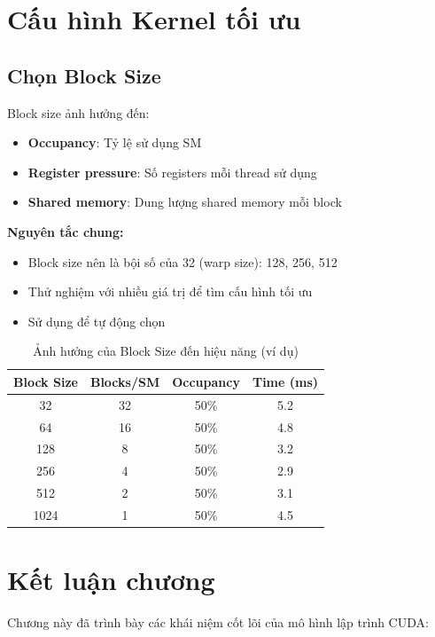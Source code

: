 \section{Cấu hình Kernel tối ưu}

\subsection{Chọn Block Size}

Block size ảnh hưởng đến:
\begin{itemize}
    \item \textbf{Occupancy}: Tỷ lệ sử dụng SM
    \item \textbf{Register pressure}: Số registers mỗi thread sử dụng
    \item \textbf{Shared memory}: Dung lượng shared memory mỗi block
\end{itemize}

\textbf{Nguyên tắc chung:}
\begin{itemize}
    \item Block size nên là bội số của 32 (warp size): 128, 256, 512
    \item Thử nghiệm với nhiều giá trị để tìm cấu hình tối ưu
    \item Sử dụng  để tự động chọn
\end{itemize}

\begin{table}[H]
\centering
\caption{Ảnh hưởng của Block Size đến hiệu năng (ví dụ)}
\label{tab:blocksize_perf}
\begin{tabular}{@{}cccc@{}}
\toprule
\textbf{Block Size} & \textbf{Blocks/SM} & \textbf{Occupancy} & \textbf{Time (ms)} \\
\midrule
32 & 32 & 50\% & 5.2 \\
64 & 16 & 50\% & 4.8 \\
128 & 8 & 50\% & 3.2 \\
256 & 4 & 50\% & 2.9 \\
512 & 2 & 50\% & 3.1 \\
1024 & 1 & 50\% & 4.5 \\
\bottomrule
\end{tabular}
\end{table}

\section{Kết luận chương}

Chương này đã trình bày các khái niệm cốt lõi của mô hình lập trình CUDA:

